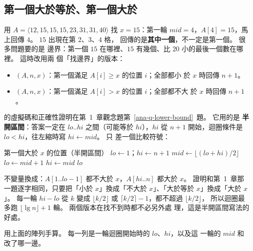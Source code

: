 \subsection{第一個大於等於、第一個大於}

用 $A = \langle 12, 15, 15, 15, 23, 31, 31, 40 \rangle$ 找 $x = 15$：第一輪
$\mathit{mid} = 4$，$A[4] = 15$，馬上回傳 $4$。 $15$ 出現在第 $2$、$3$、$4$ 格，
 回傳的是\textbf{其中一個}，不一定是第一個。 很多問題要的是
邊界：第一個 $15$ 在哪裡、$15$ 有幾個、比 $20$ 小的最後一個數在哪裡。 這時改用兩
個「找邊界」的版本：

\begin{itemize}
\item {}$(A, n, x)$：第一個滿足 $A[i] \ge x$ 的位置 $i$；全部都小
於 $x$ 時回傳 $n + 1$。
\item {}$(A, n, x)$：第一個滿足 $A[i] > x$ 的位置 $i$；全部都不大
於 $x$ 時回傳 $n + 1$。
\end{itemize}

 的虛擬碼和正確性證明在第~1~章觀念題第~\ref{ana-q-lower-bound}~題。 它用的是
\textbf{半開區間}：答案一定在 $\mathit{lo}..\mathit{hi}$ 之間（可能等於
$\mathit{hi}$），$\mathit{hi}$ 從 $n + 1$ 開始，迴圈條件是 $\mathit{lo} <
\mathit{hi}$，往左縮時寫 $\mathit{hi} \gets \mathit{mid}$。  只
差一個比較符號：

\begin{pseudo}[label=alg:dc-upper]{第一個大於 $x$ 的位置（半開區間）}
    \State $\mathit{lo} \gets 1$；$\mathit{hi} \gets n + 1$
        \State $\mathit{mid} \gets \lfloor (\mathit{lo} + \mathit{hi}) / 2 \rfloor$
            \State $\mathit{lo} \gets \mathit{mid} + 1$
        \Else
            \State $\mathit{hi} \gets \mathit{mid}$
        \EndIf
    \EndWhile
    \State \Return $\mathit{lo}$
\EndFunction
\end{pseudo}

不變量換成：$A[1..\mathit{lo}-1]$ 都不大於 $x$，$A[\mathit{hi}..n]$ 都大於 $x$。
證明和第~1~章那一題逐字相同，只要把「小於 $x$」換成「不大於 $x$」、「大於等於
$x$」換成「大於 $x$」。 每一輪 $\mathit{hi} - \mathit{lo}$ 從 $k$ 變成
$\lfloor k/2 \rfloor$ 或 $\lceil k/2 \rceil - 1$，都不超過 $\lfloor k/2 \rfloor$，
所以迴圈最多跑 $\lfloor \lg n \rfloor + 1$ 輪。 兩個版本在找不到時都不必另外處
理，這是半開區間寫法的好處。

用上面的陣列手算。 每一列是一輪迴圈開始時的 $\mathit{lo}$、$\mathit{hi}$，以及這
一輪的 $\mathit{mid}$ 和改了哪一邊。

